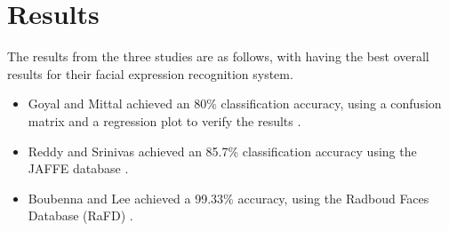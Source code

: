 \section{Results}
The results from the three studies are as follows, with \cite{3} having the best overall results for their facial expression recognition system.
\begin{itemize}
\item Goyal and Mittal achieved an 80\% classification accuracy, using a confusion matrix and a regression plot to verify the results \cite{1}.
\item Reddy and Srinivas achieved an 85.7\% classification accuracy using the JAFFE database \cite{2}.
\item Boubenna and Lee achieved a 99.33\% accuracy, using the Radboud Faces Database (RaFD) \cite{3}.
\end{itemize}



